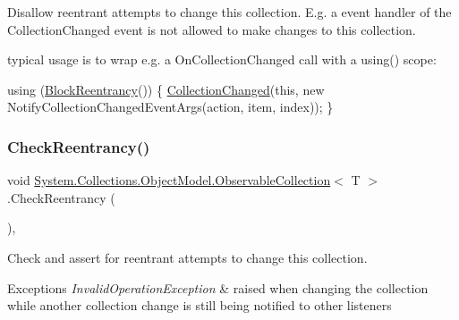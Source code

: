 Disallow reentrant attempts to change this collection. E.\+g. a event handler of the Collection\+Changed event is not allowed to make changes to this collection. 

typical usage is to wrap e.\+g. a On\+Collection\+Changed call with a using() scope\+: 
\begin{DoxyCode}
\textcolor{keyword}{using} (\hyperlink{class_system_1_1_collections_1_1_object_model_1_1_observable_collection_a5e3bd1cc8385d41ef18c5cd7142c33d1}{BlockReentrancy}())
\{
    \hyperlink{class_system_1_1_collections_1_1_object_model_1_1_observable_collection_af4a88823a7235293115b1d962f2dcc12}{CollectionChanged}(\textcolor{keyword}{this}, \textcolor{keyword}{new} NotifyCollectionChangedEventArgs(action, item, index));
\}
\end{DoxyCode}
 \mbox{\label{class_system_1_1_collections_1_1_object_model_1_1_observable_collection_a439683a525265dbad655fbe3d8cb4979}} 
\subsubsection{\texorpdfstring{Check\+Reentrancy()}{CheckReentrancy()}}
{\footnotesize\ttfamily void \hyperlink{class_system_1_1_collections_1_1_object_model_1_1_observable_collection}{System.\+Collections.\+Object\+Model.\+Observable\+Collection}$<$ T $>$.Check\+Reentrancy (\begin{DoxyParamCaption}{ }\end{DoxyParamCaption})\hspace{0.3cm}{\ttfamily [inline]}, {\ttfamily [protected]}}



Check and assert for reentrant attempts to change this collection. 


\begin{DoxyExceptions}{Exceptions}
{\em Invalid\+Operation\+Exception} & raised when changing the collection while another collection change is still being notified to other listeners \\
\hline
\end{DoxyExceptions}
\mbox{\label{class_system_1_1_collections_1_1_object_model_1_1_observable_collection_ab3957b9a21cee219a451821557229407}} 
